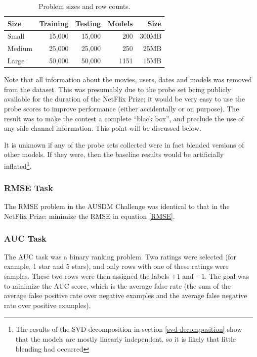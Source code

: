 \documentclass{article}
\begin{document}
\begin{table}[t]
\caption{Problem sizes and row counts.}
\label{problems}
\vskip 0.15in
\begin{center}
\begin{small}
\begin{sc}
\begin{tabular}{lrrrr}
\hline
\abovespace\belowspace
Size & Training & Testing & Models & Size \\
\hline
\abovespace
Small    & 15,000 & 15,000 & 200 & 300MB \\
Medium   & 25,000 & 25,000 & 250 &  25MB \\
\belowspace
Large    & 50,000 & 50,000 & 1151 & 15MB \\
\hline
\end{tabular}
\end{sc}
\end{small}
\end{center}
\vskip -0.1in
\end{table}

Note that all information about the movies, users, dates and models was removed from the dataset.  This was presumably due to the probe set being publicly available for the duration of the NetFlix Prize; it would be very easy to use the probe scores to improve performance (either accidentally or on purpose).  The result was to make the contest a complete ``black box'', and preclude the use of any side-channel information.  This point will be discussed below.

It is unknown if any of the probe sets collected were in fact blended versions of other models.  If they were, then the baseline results would be artificially inflated\footnote{The results of the SVD decomposition in section \ref{svd-decomposition} show that the models are mostly linearly independent, so it is likely that little blending had occurred}.

\subsubsection{RMSE Task}

The RMSE problem in the AUSDM Challenge was identical to that in the NetFlix Prize: minimize the RMSE in equation \ref{RMSE}.

\subsubsection{AUC Task}

The AUC task was a binary ranking problem.  Two ratings were selected (for example, 1 star and 5 stars), and only rows with one of these ratings were samples.  These two rows were then assigned the labels $+1$ and $-1$.  The goal was to minimize the AUC score, which is the average false rate (the sum of the average false positive rate over negative examples and the average false negative rate over positive examples).
\end{document}
